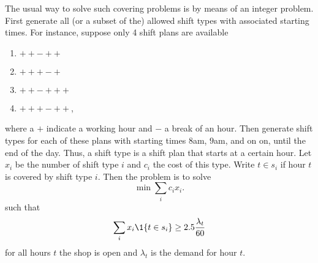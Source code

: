 The usual way to solve such  covering problems is by means of an integer
problem. First generate all (or a subset of the) allowed shift types
with associated starting times. For instance, suppose only 4 shift
plans are available
\begin{enumerate}
\item $++-++$
\item $+++-+$
\item $++-+++$
\item $+++-++$,
\end{enumerate}
where a $+$ indicate a working hour and $-$ a break of an hour. Then
generate shift types for each of these plans with starting times
$8$am, $9$am, and on on, until the end of the day. Thus, a shift type
is a shift plan that starts at a certain hour. Let $x_i$ be the number
of shift type $i$ and $c_i$ the cost of this type. Write $t\in s_i$ if
hour $t$ is covered by shift type $i$.  Then the problem is to solve
\begin{equation*}
  \min \sum_i c_i x_i.
\end{equation*}
such that 
\begin{equation*}
  \sum_i x_i \1{t \in s_i} \geq 2.5 \frac{\lambda_t}{60}
\end{equation*}
for all hours $t$ the shop is open and $\lambda_t$ is the demand for
hour $t$.








